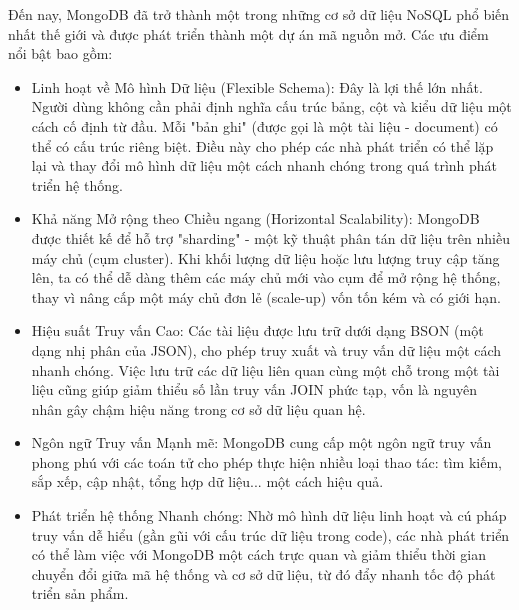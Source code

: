 Đến nay, MongoDB đã trở thành một trong những cơ sở dữ liệu NoSQL phổ biến nhất thế giới và được phát triển thành một dự án mã nguồn mở. Các ưu điểm nổi bật bao gồm:
\begin{itemize}
    \item[-] Linh hoạt về Mô hình Dữ liệu (Flexible Schema): Đây là lợi thế lớn nhất. Người dùng không cần phải định nghĩa cấu trúc bảng, cột và kiểu dữ liệu một cách cố định từ đầu. Mỗi "bản ghi" (được gọi là một tài liệu - document) có thể có cấu trúc riêng biệt. Điều này cho phép các nhà phát triển có thể lặp lại và thay đổi mô hình dữ liệu một cách nhanh chóng trong quá trình phát triển hệ thống.
    \item[-] Khả năng Mở rộng theo Chiều ngang (Horizontal Scalability): MongoDB được thiết kế để hỗ trợ "sharding" - một kỹ thuật phân tán dữ liệu trên nhiều máy chủ (cụm cluster). Khi khối lượng dữ liệu hoặc lưu lượng truy cập tăng lên, ta có thể dễ dàng thêm các máy chủ mới vào cụm để mở rộng hệ thống, thay vì nâng cấp một máy chủ đơn lẻ (scale-up) vốn tốn kém và có giới hạn.
    \item[-] Hiệu suất Truy vấn Cao: Các tài liệu được lưu trữ dưới dạng BSON (một dạng nhị phân của JSON), cho phép truy xuất và truy vấn dữ liệu một cách nhanh chóng. Việc lưu trữ các dữ liệu liên quan cùng một chỗ trong một tài liệu cũng giúp giảm thiểu số lần truy vấn JOIN phức tạp, vốn là nguyên nhân gây chậm hiệu năng trong cơ sở dữ liệu quan hệ.
    \item[-] Ngôn ngữ Truy vấn Mạnh mẽ: MongoDB cung cấp một ngôn ngữ truy vấn phong phú với các toán tử cho phép thực hiện nhiều loại thao tác: tìm kiếm, sắp xếp, cập nhật, tổng hợp dữ liệu... một cách hiệu quả.
    \item[-] Phát triển hệ thống Nhanh chóng: Nhờ mô hình dữ liệu linh hoạt và cú pháp truy vấn dễ hiểu (gần gũi với cấu trúc dữ liệu trong code), các nhà phát triển có thể làm việc với MongoDB một cách trực quan và giảm thiểu thời gian chuyển đổi giữa mã hệ thống và cơ sở dữ liệu, từ đó đẩy nhanh tốc độ phát triển sản phẩm.
\end{itemize}

